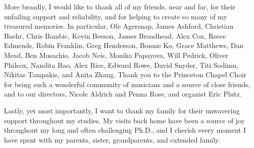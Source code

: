 More broadly, I would like to thank all of my friends, near and far,
for their unfailing support and reliability, and for
helping to create so many of my treasured memories. In particular,
Ole Agersnap,
James Ashford,
Christian Baehr,
Chris Bambic,
Kevin Beeson,
James Broadhead,
Alex Cox,
Reece Edmends,
Robin Franklin,
Greg Henderson,
Bonnie Ko,
Grace Matthews,
Dan Mead,
Ben Musachio,
Jacob Neis,
Monika Papayova,
Will Pedrick,
Oliver Philcox,
Nandita Rao,
Alex Rice,
Edward Rowe,
David Snyder,
Titi Sodimu,
Nikitas Tampakis,
and Anita Zhang.
Thank you to the Princeton Chapel Choir for being such a wonderful
community of musicians and a source of close friends,
and to our directors, Nicole Aldrich and Penna Rose, and organist Eric Plutz.

Lastly, yet most importantly, I want to thank my family for their unwavering
support throughout my studies. My visits back home have been a source of joy
throughout my long and often challenging Ph.D., and I cherish every moment I
have spent with my parents, sister, grandparents, and extended family.

